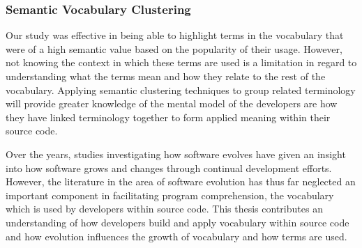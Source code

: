 
\subsubsection{Semantic Vocabulary Clustering} %
\label{ssub:semantic_vocabulary_clustering}

Our study was effective in being able to highlight terms in the vocabulary that were of a high semantic value based on the popularity of their usage. However, not knowing the context in which these terms are used is a limitation in regard to understanding what the terms mean and how they relate to the rest of the vocabulary. Applying semantic clustering techniques \cite{Blei03a, Kuhn07a} to group related terminology will provide greater knowledge of the mental model of the developers are how they have linked terminology together to form applied meaning within their source code.



Over the years, studies investigating how software evolves have given an insight into how software grows and changes through continual development efforts. However, the literature in the area of software evolution has thus far neglected an important component in facilitating program comprehension, the vocabulary which is used by developers within source code. This thesis contributes an understanding of how developers build and apply vocabulary within source code and how evolution influences the growth of vocabulary and how terms are used.